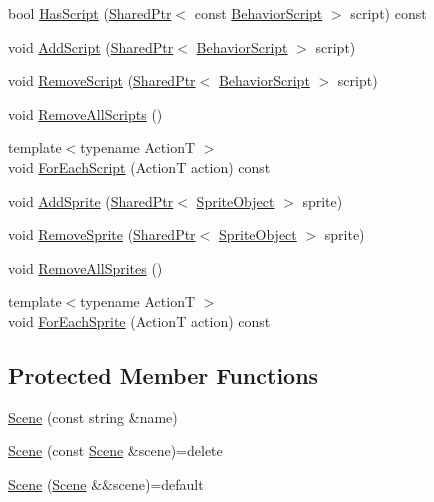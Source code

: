 \begin{DoxyCompactItemize}
\item 
bool \hyperlink{classmage_1_1_scene_a9dd6c49e9db7590de1de4fbd128c78a9}{Has\+Script} (\hyperlink{namespacemage_a1e01ae66713838a7a67d30e44c67703e}{Shared\+Ptr}$<$ const \hyperlink{classmage_1_1_behavior_script}{Behavior\+Script} $>$ script) const
\item 
void \hyperlink{classmage_1_1_scene_ab97b66c81c32681699052e154d0e0722}{Add\+Script} (\hyperlink{namespacemage_a1e01ae66713838a7a67d30e44c67703e}{Shared\+Ptr}$<$ \hyperlink{classmage_1_1_behavior_script}{Behavior\+Script} $>$ script)
\item 
void \hyperlink{classmage_1_1_scene_a82705ba56543dea410439760b1667bc5}{Remove\+Script} (\hyperlink{namespacemage_a1e01ae66713838a7a67d30e44c67703e}{Shared\+Ptr}$<$ \hyperlink{classmage_1_1_behavior_script}{Behavior\+Script} $>$ script)
\item 
void \hyperlink{classmage_1_1_scene_a04b6e0b4d9ca18d15d3da098e581d336}{Remove\+All\+Scripts} ()
\item 
{\footnotesize template$<$typename ActionT $>$ }\\void \hyperlink{classmage_1_1_scene_a4d16d973adce12868b9a0df9d92ef6d6}{For\+Each\+Script} (ActionT action) const
\item 
void \hyperlink{classmage_1_1_scene_a735a4eba6bf6a072195f1cfc58dfca47}{Add\+Sprite} (\hyperlink{namespacemage_a1e01ae66713838a7a67d30e44c67703e}{Shared\+Ptr}$<$ \hyperlink{classmage_1_1_sprite_object}{Sprite\+Object} $>$ sprite)
\item 
void \hyperlink{classmage_1_1_scene_a6d886d48157b9988ab61cc9b01ee752e}{Remove\+Sprite} (\hyperlink{namespacemage_a1e01ae66713838a7a67d30e44c67703e}{Shared\+Ptr}$<$ \hyperlink{classmage_1_1_sprite_object}{Sprite\+Object} $>$ sprite)
\item 
void \hyperlink{classmage_1_1_scene_aad8b532e9c127fd216ca9db9ad9f3420}{Remove\+All\+Sprites} ()
\item 
{\footnotesize template$<$typename ActionT $>$ }\\void \hyperlink{classmage_1_1_scene_ae181b160f9a75593db9f551c9c233329}{For\+Each\+Sprite} (ActionT action) const
\end{DoxyCompactItemize}
\subsection*{Protected Member Functions}
\begin{DoxyCompactItemize}
\item 
\hyperlink{classmage_1_1_scene_aab61b38547fc53aa9c5b3b559f4d2e26}{Scene} (const string \&name)
\item 
\hyperlink{classmage_1_1_scene_a88d83ccb2e10549d5370f850b2b4c228}{Scene} (const \hyperlink{classmage_1_1_scene}{Scene} \&scene)=delete
\item 
\hyperlink{classmage_1_1_scene_a35b8fc4242c2348e53014b96416fc3d3}{Scene} (\hyperlink{classmage_1_1_scene}{Scene} \&\&scene)=default
\end{DoxyCompactItemize}
